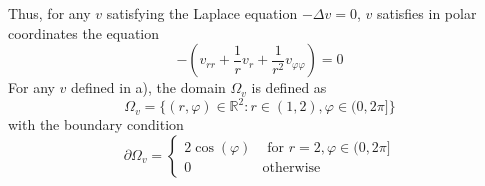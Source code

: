 Thus, for any $v$ satisfying the Laplace equation $-\Delta v = 0$, $v$ satisfies in polar coordinates the equation
\begin{equation}
	-\left(v_{rr} + \frac{1}{r} v_r + \frac{1}{r^2} v_{\varphi\varphi}\right)=0
\end{equation}
%
For any $v$ defined in a), the domain $\Omega_v$ is defined as
\begin{equation}
	\Omega_v = \{(r,\varphi) \in \mathbb{R}^2 \colon r \in (1,2), \varphi \in (0, 2\pi]\}
\end{equation}
with the boundary condition 
\begin{equation}
	\partial \Omega_v =
	\begin{cases}
		2\cos{(\varphi)} &\text{ for } r = 2,  \varphi \in (0, 2\pi] \\
		0 &\text{otherwise}
	\end{cases}
\end{equation}
%

%
%

%

%
